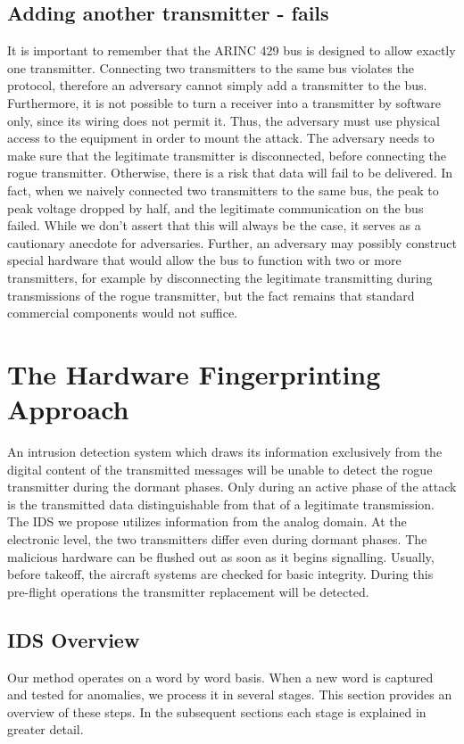 \documentclass[conference]{IEEEtran}
\begin{document}
\subsection{Adding another transmitter - fails}
  It is important to remember that the ARINC 429 bus is designed to allow exactly one transmitter. Connecting two transmitters to the same bus violates the protocol, therefore an adversary cannot simply add a transmitter to the bus. Furthermore, it is not possible to turn a receiver into a transmitter by software only, since its wiring does not permit it. Thus, the adversary must use physical access to the equipment in order to mount the attack. The adversary needs to make sure that the legitimate transmitter is disconnected, before connecting the rogue transmitter. Otherwise, there is a risk that data will fail to be delivered. In fact, when we naively connected two transmitters to the same bus, the peak to peak voltage dropped by half, and the legitimate communication on the bus failed. While we don't assert that this will always be the case, it serves as a cautionary anecdote for adversaries. Further, an adversary may possibly construct special hardware that would allow the bus to function with two or more transmitters, for example by disconnecting the legitimate transmitting during transmissions of the rogue transmitter, but the fact remains that standard commercial components would not suffice.

\section{The Hardware Fingerprinting Approach}
  An intrusion detection system which draws its information exclusively from the digital content of the transmitted messages will be unable to detect the rogue transmitter during the dormant phases. Only during an active phase of the attack is the transmitted data distinguishable from that of a legitimate transmission. The IDS we propose utilizes information from the analog domain. At the electronic level, the two transmitters differ even during dormant phases. The malicious hardware can be flushed out as soon as it begins signalling.
  Usually, before takeoff, the aircraft systems are checked for basic integrity. During this pre-flight operations the transmitter replacement will be detected.
  
\subsection{IDS Overview} \label{Overview}
  Our method operates on a word by word basis. When a new word is captured and tested for anomalies, we process it in several stages. This section provides an overview of these steps. In the subsequent sections each stage is explained in greater detail.
  
\end{document}
